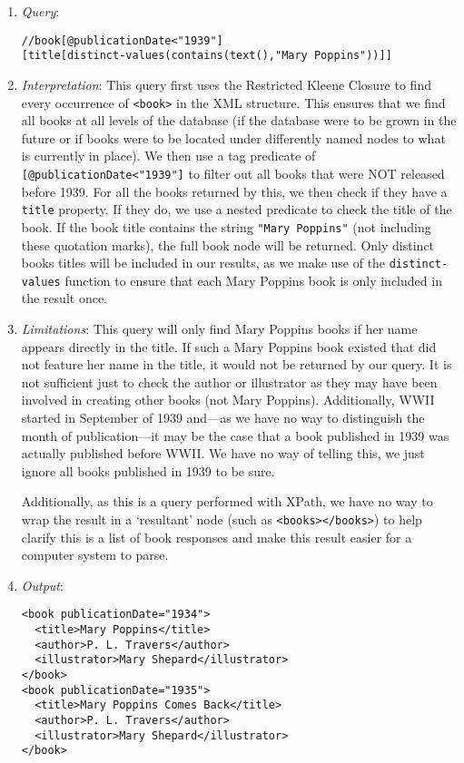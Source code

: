 \documentclass[11pt]{article}
\begin{document}
\begin{enumerate}
\item \textit{Query}:
\begin{small}
\begin{verbatim}
//book[@publicationDate<"1939"]
[title[distinct-values(contains(text(),"Mary Poppins"))]]
\end{verbatim}
\end{small}

\item \textit{Interpretation}: This query first uses the Restricted Kleene Closure to find every occurrence of \texttt{<book>} in the XML structure. This ensures that we find all books at all levels of the database (if the database were to be grown in the future or if books were to be located under differently named nodes to what is currently in place). We then use a tag predicate of \texttt{[@publicationDate<"1939"]} to filter out all books that were NOT released before 1939. For all the books returned by this, we then check if they have a \texttt{title} property. If they do, we use a nested predicate to check the title of the book. If the book title contains the string \texttt{"Mary Poppins"} (not including these quotation marks), the full book node will be returned. Only distinct books titles will be included in our results, as we make use of the \texttt{distinct-values} function to ensure that each Mary Poppins book is only included in the result once.

\item \textit{Limitations}: This query will only find Mary Poppins books if her name appears directly in the title. If such a Mary Poppins book existed that did not feature her name in the title, it would not be returned by our query. It is not sufficient just to check the author or illustrator as they may have been involved in creating other books (not Mary Poppins). Additionally, WWII started in September of 1939 and---as we have no way to distinguish the month of publication---it may be the case that a book published in 1939 was actually published before WWII. We have no way of telling this, we just ignore all books published in 1939 to be sure.

Additionally, as this is a query performed with XPath, we have no way to wrap the result in a `resultant' node (such as \texttt{<books></books>}) to help clarify this is a list of book responses and make this result easier for a computer system to parse.

\item \textit{Output}:
\begin{verbatim}
<book publicationDate="1934">
  <title>Mary Poppins</title>
  <author>P. L. Travers</author>
  <illustrator>Mary Shepard</illustrator>
</book>
<book publicationDate="1935">
  <title>Mary Poppins Comes Back</title>
  <author>P. L. Travers</author>
  <illustrator>Mary Shepard</illustrator>
</book>
\end{verbatim} 
\end{enumerate}
\end{document}
